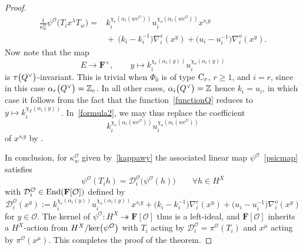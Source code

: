 \documentclass[11pt]{article}
\numberwithin{equation}{section}
\numberwithin{equation}{section}
\begin{document}
\begin{proof}
\begin{align}
\frac{1}{\kappa_w^\mathcal{O}}\psi^\mathcal{O}\bigl(T_ix^\lambda T_w\bigr)
={}&k_i^{\chi_e(\alpha_i (wc^\mathcal{O} ))}u_i^{\chi_o(\alpha_i (wc^\mathcal{O} ))}x^{s_iy}\nonumber\\
&{}{+}\ \bigl(k_i-k_i^{-1}\bigr)\nabla_i^e(x^y)+\bigl(u_i-u_i^{-1}\bigr)\nabla_i^o(x^y).\label{formula2}
\end{align}
Now note that the map
\begin{equation}\label{functionQ}
E\rightarrow\mathbf{F}^\times,\qquad y\mapsto k_i^{\chi_e(\alpha_i(y))}u_i^{\chi_o(\alpha_i(y))}
\end{equation}
is $\tau\smash{\bigl(Q^\vee\bigr)}$-invariant. This is trivial when $\Phi_0$ is of type ${\rm C}_r$, $r\geq 1$, and $i=r$, since in this case $\alpha_r\smash{\bigl(Q^\vee\bigr)}=\mathbb{Z}_e$. In all other cases, $\alpha_i\smash{\bigl(Q^\vee\bigr)}=\mathbb{Z}$ hence $k_i=u_i$, in which case it follows from the fact that the function~\eqref{functionQ} reduces to $y\mapsto k_i^{\chi_{\mathbb{Z}}(\alpha_i(y))}$.
In~\eqref{formula2}, we may thus replace the coefficient
\[
k_i^{\chi_e(\alpha_i (wc^\mathcal{O} ))}u_i^{\chi_o(\alpha_i (wc^\mathcal{O} ))}
\] of $x^{s_iy}$ by
.

In conclusion, for $\kappa_w^\mathcal{O}$ given by~\eqref{kappawy} the associated linear map $\psi^\mathcal{O}$~\eqref{psicmap} satisfies
\[
\psi^\mathcal{O}(T_ih)=\mathcal{D}_i^\mathcal{O}\bigl(\psi^\mathcal{O}(h)\bigr)\qquad \forall h\in H^X
\]
with $\mathcal{D}_i^\mathcal{O}\in\textup{End}(\mathbf{F}[\mathcal{O}])$ defined by
\begin{equation*}
\mathcal{D}_i^\mathcal{O}(x^y):=k_i^{\chi_e(\alpha_i(y))}u_i^{\chi_o(\alpha_i(y))}x^{s_iy}+\bigl(k_i-k_i^{-1}\bigr)\nabla_i^e(x^y)+\bigl(u_i-u_i^{-1}\bigr)\nabla_i^o(x^y)
\end{equation*}
for $y\in\mathcal{O}$.
The kernel of $\psi^\mathcal{O}\colon H^X\twoheadrightarrow\mathbf{F}[\mathcal{O}]$ thus is a left-ideal, and $\mathbf{F}[\mathcal{O}]$ inherits a $H^X$-action from $H^X/\textup{ker}\bigl(\psi^\mathcal{O}\bigr)$ with $T_i$ acting by $\mathcal{D}_i^\mathcal{O}=\pi^\mathcal{O}(T_i)$ and $x^\mu$ acting by
$\pi^\mathcal{O}(x^\mu)$. This completes the proof of the theorem.
\end{proof}
\end{document}
